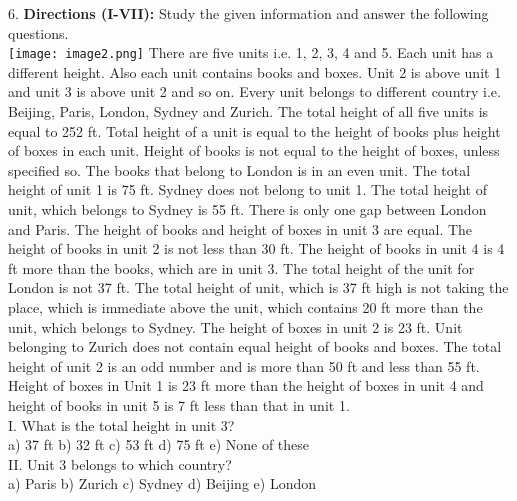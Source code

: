 \documentclass[
]{article}
\begin{document}
6. \textbf{Directions (I-VII):} Study the given information and answer the following questions.\\
\texttt{[image: image2.png]}
There are five units i.e. 1, 2, 3, 4 and 5. Each unit has a different height. Also each unit
contains books and boxes. Unit 2 is above unit 1 and unit 3 is above unit 2 and so on. Every
unit belongs to different country i.e. Beijing, Paris, London, Sydney and Zurich. The total
height of all five units is equal to 252 ft. Total height of a unit is equal to the height of books
plus height of boxes in each unit. Height of books is not equal to the height of boxes, unless
specified so. The books that belong to London is in an even unit. The total height of unit 1 is
75 ft. Sydney does not belong to unit 1. The total height of unit, which belongs to Sydney is
55 ft. There is only one gap between London and Paris. The height of books and height of
boxes in unit 3 are equal. The height of books in unit 2 is not less than 30 ft. The height of
books in unit 4 is 4 ft more than the books, which are in unit 3. The total height of the unit
for London is not 37 ft. The total height of unit, which is 37 ft high is not taking the place,
which is immediate above the unit, which contains 20 ft more than the unit, which belongs
to Sydney. The height of boxes in unit 2 is 23 ft. Unit belonging to Zurich does not contain
equal height of books and boxes. The total height of unit 2 is an odd number and is more
than 50 ft and less than 55 ft. Height of boxes in Unit 1 is 23 ft more than the height of boxes
in unit 4 and height of books in unit 5 is 7 ft less than that in unit 1.\\

I. What is the total height in unit 3?\\
a) 37 ft \hspace{2mm}b) 32 ft \hspace{2mm}c) 53 ft \hspace{2mm}d) 75 ft \hspace{2mm}e) None of these\\

II. Unit 3 belongs to which country?\\
a) Paris \hspace{2mm}b) Zurich \hspace{2mm}c) Sydney \hspace{2mm}d) Beijing \hspace{2mm}e) London\\
\end{document}
